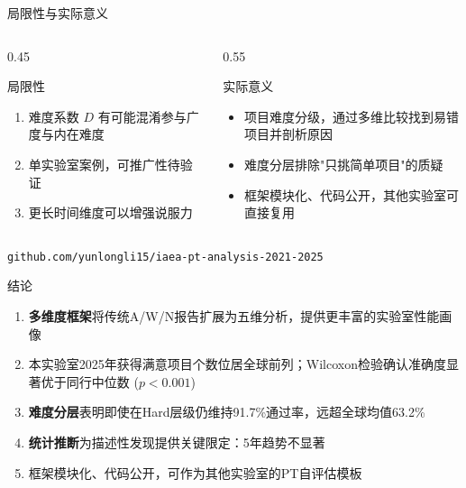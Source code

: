 \documentclass[10pt,aspectratio=169]{beamer}
\newenvironment{tightitemize}{\begin{itemize}\setlength{\itemsep}{2pt}\setlength{\parskip}{0pt}\setlength{\parsep}{0pt}}{\end{itemize}}
\newenvironment{tightenumerate}{\begin{enumerate}\setlength{\itemsep}{2pt}\setlength{\parskip}{0pt}\setlength{\parsep}{0pt}}{\end{enumerate}}
\begin{document}
\begin{frame}{局限性与实际意义}
  \small
  \begin{columns}
    \begin{column}{0.45\textwidth}
      \begin{block}{\small 局限性}
        \begin{tightenumerate}
          \item 难度系数 $D$ 有可能混淆参与广度与内在难度
          \item 单实验室案例，可推广性待验证
          \item 更长时间维度可以增强说服力
        \end{tightenumerate}
      \end{block}
    \end{column}
    \begin{column}{0.55\textwidth}
      \begin{block}{\small 实际意义}
        \begin{tightitemize}
	\item 项目难度分级，通过多维比较找到易错项目并剖析原因
          \item 难度分层排除"只挑简单项目"的质疑
          \item 框架模块化、代码公开，其他实验室可直接复用
        \end{tightitemize}
      \end{block}
    \end{column}
  \end{columns}
      \vspace{0.2cm}
      \centering\textcolor{mainblue}{\small\texttt{github.com/yunlongli15/iaea-pt-analysis-2021-2025}}
\end{frame}

\begin{frame}{结论}
  \small
  \begin{tightenumerate}
    \item \textbf{多维度框架}将传统A/W/N报告扩展为五维分析，提供更丰富的实验室性能画像
    \vspace{0.1cm}
    \item 本实验室2025年获得满意项目个数位居全球前列；Wilcoxon检验确认准确度显著优于同行中位数 ($p{<}0.001$)
    \vspace{0.1cm}
    \item \textbf{难度分层}表明即使在Hard层级仍维持91.7\%通过率，远超全球均值63.2\%
    \vspace{0.1cm}
    \item \textbf{统计推断}为描述性发现提供关键限定：5年趋势不显著
    \vspace{0.1cm}
    \item 框架模块化、代码公开，可作为其他实验室的\textcolor{accent}{PT自评估模板}
  \end{tightenumerate}
\end{frame}
\end{document}
